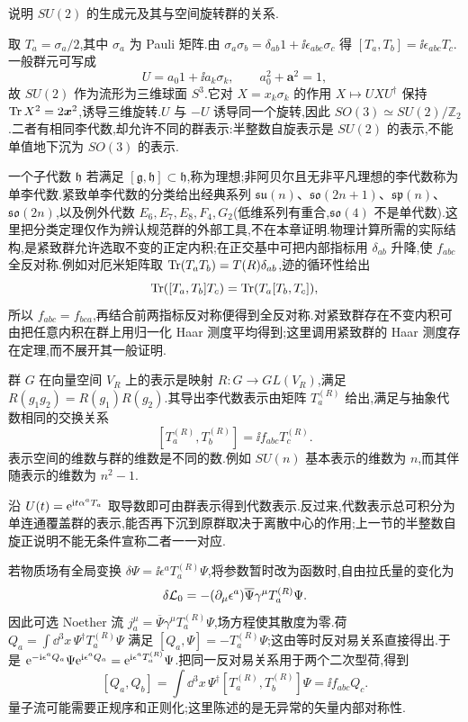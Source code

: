 \begin{example}
说明 $SU(2)$ 的生成元及其与空间旋转群的关系.
\end{example}
\begin{solution}
取 $T_a=\sigma_a/2$,其中 $\sigma_a$ 为 Pauli 矩阵.由
$\sigma_a\sigma_b=\delta_{ab}1+\ii\epsilon_{abc}\sigma_c$ 得
$[T_a,T_b]=\ii\epsilon_{abc}T_c$.一般群元可写成
\[
 U=a_0 1+\ii a_k\sigma_k,\qquad a_0^2+\boldsymbol a^2=1,
\]
故 $SU(2)$ 作为流形为三维球面 $S^3$.它对 $X=x_k\sigma_k$ 的作用 $X\mapsto UXU^\dagger$ 保持 $\operatorname{Tr} X^2=2\boldsymbol x^2$,诱导三维旋转.$U$ 与 $-U$ 诱导同一个旋转,因此 $SO(3)\simeq SU(2)/\mathbb Z_2$.二者有相同李代数,却允许不同的群表示:半整数自旋表示是 $SU(2)$ 的表示,不能单值地下沉为 $SO(3)$ 的表示.
\end{solution}

一个子代数 $\mathfrak h$ 若满足 $[\mathfrak g,\mathfrak h]\subset\mathfrak h$,称为理想;非阿贝尔且无非平凡理想的李代数称为单李代数.紧致单李代数的分类给出经典系列 $\mathfrak{su}(n)$、$\mathfrak{so}(2n+1)$、$\mathfrak{sp}(n)$、$\mathfrak{so}(2n)$,以及例外代数 $E_6,E_7,E_8,F_4,G_2$(低维系列有重合,$\mathfrak{so}(4)$ 不是单代数).这里把分类定理仅作为辨认规范群的外部工具,不在本章证明.物理计算所需的实际结构,是紧致群允许选取不变的正定内积;在正交基中可把内部指标用 $\delta_{ab}$ 升降,使 $f_{abc}$ 全反对称.例如对厄米矩阵取 $\operatorname{Tr}(T_aT_b)=T(R)\delta_{ab}$,迹的循环性给出
\[
 \operatorname{Tr}([T_a,T_b]T_c)=\operatorname{Tr}(T_a[T_b,T_c]),
\]
所以 $f_{abc}=f_{bca}$,再结合前两指标反对称便得到全反对称.对紧致群存在不变内积可由把任意内积在群上用归一化 Haar 测度平均得到;这里调用紧致群的 Haar 测度存在定理,而不展开其一般证明.

\begin{definition}[表示]
群 $G$ 在向量空间 $V_R$ 上的表示是映射 $R:G\to GL(V_R)$,满足 $R(g_1g_2)=R(g_1)R(g_2)$.其导出李代数表示由矩阵 $T_a^{(R)}$ 给出,满足与抽象代数相同的交换关系
\[
 [T_a^{(R)},T_b^{(R)}]=\ii f_{abc}T_c^{(R)}.
\]
表示空间的维数与群的维数是不同的数.例如 $SU(n)$ 基本表示的维数为 $n$,而其伴随表示的维数为 $n^2-1$.
\end{definition}

沿 $U(t)=\mathrm e^{\mathrm i t\alpha^aT_a}$ 取导数即可由群表示得到代数表示.反过来,代数表示总可积分为单连通覆盖群的表示,能否再下沉到原群取决于离散中心的作用;上一节的半整数自旋正说明不能无条件宣称二者一一对应.

若物质场有全局变换 $\delta\Psi=\ii\epsilon^aT_a^{(R)}\Psi$,将参数暂时改为函数时,自由拉氏量的变化为
\[
 \delta\mathcal L_0=-(\partial_\mu\epsilon^a)\overline\Psi\gamma^\mu T_a^{(R)}\Psi.
\]
因此可选 Noether 流 $j_a^\mu=\overline\Psi\gamma^\mu T_a^{(R)}\Psi$,场方程使其散度为零.荷 $Q_a=\int\dd^3x\,\Psi^\dagger T_a^{(R)}\Psi$ 满足
$[Q_a,\Psi]=-T_a^{(R)}\Psi$;这由等时反对易关系直接得出.于是 $\mathrm e^{-\mathrm i\epsilon^aQ_a}\Psi\mathrm e^{\mathrm i\epsilon^aQ_a}=\mathrm e^{\mathrm i\epsilon^aT_a^{(R)}}\Psi$.把同一反对易关系用于两个二次型荷,得到
\[
 [Q_a,Q_b]=\int\dd^3x\,\Psi^\dagger[T_a^{(R)},T_b^{(R)}]\Psi
 =\ii f_{abc}Q_c.
\]
量子流可能需要正规序和正则化;这里陈述的是无异常的矢量内部对称性.

